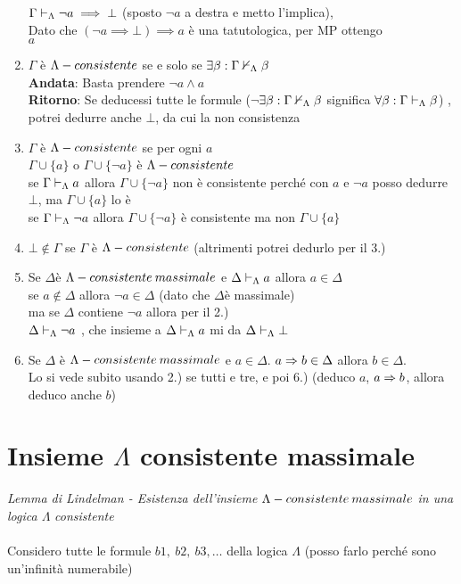 \begin{enumerate}
 $\Gamma\vdash_{\Lambda}\neg a\implies\bot$ (sposto $\neg a$ a destra
e metto l'implica), \\
 Dato che $(\neg a\implies\bot)\implies a$ è una tatutologica, per
MP ottengo\\
 $a$ 
\item $\Gamma$ è $ $$\mbox{\ensuremath{\Lambda}}-consistente$ se e solo se $\exists\beta:\Gamma\nvdash_{\Lambda}\beta$
\\
 \textbf{Andata}: Basta prendere $\neg a\wedge a$\\
 \textbf{Ritorno}: Se deducessi tutte le formule ($\neg$$\exists\beta:\Gamma\nvdash_{\Lambda}\beta$
significa $\forall\beta:\Gamma\vdash_{\Lambda}\beta$) , potrei dedurre anche
$\bot$, da cui la non consistenza 
\item $\Gamma$ è $\mbox{\ensuremath{\Lambda}}-consistente$ se per ogni $a$ \\
 $\Gamma\cup\{a\}$ o $\Gamma\cup\{\neg a\}$ è $\mbox{\ensuremath{\Lambda}}-consistente$\\
 se $\Gamma\vdash_{\Lambda}a$ allora $ $$\Gamma\cup\{\neg a\}$ non è consistente
perché con $a$ e $\neg a$ posso dedurre $\bot$, ma $\Gamma\cup\{a\}$
lo è \\
 se $\Gamma\vdash_{\Lambda}\neg a$ allora $ $$\Gamma\cup\{\neg a\}$ è
consistente ma non $\Gamma\cup\{a\}$ 
\item $\bot$$\notin\Gamma$ se $\Gamma$ è $\mbox{\ensuremath{\Lambda}}-consistente$ (altrimenti potrei
dedurlo per il 3.) 
\item Se $\Delta$è $\mbox{\ensuremath{\Lambda}}-consistente\: massimale$ e $\Delta\vdash_{\Lambda}a$ allora
$a\in\Delta$\\
 se $a\notin\Delta$ allora $\neg a\in\Delta$ (dato che $\Delta$è
massimale) \\
 ma se $\Delta$ contiene $\neg a$ allora per il 2.)\\
 $\Delta\vdash_{\Lambda}\neg a$ , che insieme a $\Delta\vdash_{\Lambda}a$ mi
da $\Delta\vdash_{\Lambda}\bot$ 
\item Se $\Delta$ è $\Lambda-consistente\: massimale$ e $ $$a\in\Delta$. $a\Rightarrow b\in\Delta$
allora $b\in\Delta$. \\
 Lo si vede subito usando 2.) se tutti e tre, e poi 6.) (deduco $a$,
$a\Rightarrow b$, allora deduco anche $b$) 
\end{enumerate}

\section{Insieme $\Lambda$ consistente massimale}

\emph{\large{{{Lemma di Lindelman - Esistenza dell'insieme $\Lambda-consistente\: massimale$}}}}{\large{{
}}}\emph{\large{{{in una logica $\Lambda$}}}}{\large{{ }}}\emph{\large{{{consistente}}}}{\large{{}}}\\
 {\large{{ }}}\\
 {\large{{ Considero tutte le formule $b1,\ b2,\ b3,\dots$ della
logica $\Lambda$ (posso farlo perché sono un'infinità numerabile)}}}{\large \par}

